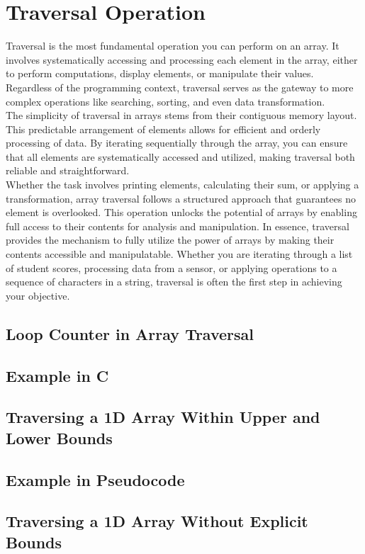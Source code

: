 \documentclass[12pt, oneside]{book}
\begin{document}
	\section{Traversal Operation}
	Traversal is the most fundamental operation you can perform on an array. It involves systematically accessing and processing each element in the array, either to perform computations, display elements, or manipulate their values. Regardless of the programming context, traversal serves as the gateway to more complex operations like searching, sorting, and even data transformation.\\The simplicity of traversal in arrays stems from their contiguous memory layout. This predictable arrangement of elements allows for efficient and orderly processing of data. By iterating sequentially through the array, you can ensure that all elements are systematically accessed and utilized, making traversal both reliable and straightforward.\\Whether the task involves printing elements, calculating their sum, or applying a transformation, array traversal follows a structured approach that guarantees no element is overlooked. This operation unlocks the potential of arrays by enabling full access to their contents for analysis and manipulation.  In essence, traversal provides the mechanism to fully utilize the power of arrays by making their contents accessible and manipulatable. Whether you are iterating through a list of student scores, processing data from a sensor, or applying operations to a sequence of characters in a string, traversal is often the first step in achieving your objective.
	\subsection{Loop Counter in Array Traversal} 
	\subsection{Example in C}
	\subsection{Traversing a 1D Array Within Upper and Lower Bounds}
	\subsection{ Example in Pseudocode}
	\subsection{Traversing a 1D Array Without Explicit Bounds}
\end{document}
